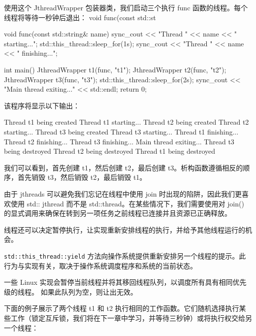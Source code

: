 使用这个 JthreadWrapper 包装器类，我们启动三个执行 func 函数的线程。每个线程将等待一秒钟后退出： void func(const std::st

\begin{cpp}
void func(const std::string& name) {
    sync_cout << "Thread " << name << " starting...\n";
    std::this_thread::sleep_for(1s);
    sync_cout << "Thread " << name << " finishing...\n";
}

int main() {
    JthreadWrapper t1(func, "t1");
    JthreadWrapper t2(func, "t2");
    JthreadWrapper t3(func, "t3");
    std::this_thread::sleep_for(2s);
    sync_cout << "Main thread exiting..." << std::endl;
    return 0;
}
\end{cpp}

该程序将显示以下输出：

\begin{shell}
Thread t1 being created
Thread t1 starting...
Thread t2 being created
Thread t2 starting...
Thread t3 being created
Thread t3 starting...
Thread t1 finishing...
Thread t2 finishing...
Thread t3 finishing...
Main thread exiting...
Thread t3 being destroyed
Thread t2 being destroyed
Thread t1 being destroyed
\end{shell}

我们可以看到，首先创建 t1，然后创建 t2，最后创建 t3。析构函数遵循相反的顺序，首先销毁 t3，然后销毁 t2，最后销毁 t1。

由于 jthreads 可以避免我们忘记在线程中使用 join 时出现的陷阱，因此我们更喜欢使用 std:: jthread 而不是 std::thread。在某些情况下，我们需要使用对 join() 的显式调用来确保在转到另一项任务之前线程已连接并且资源已正确释放。


线程还可以决定暂停执行，让实现重新安排线程的执行，并给予其他线程运行的机会。

\verb|std::this_thread::yield| 方法向操作系统提供重新安排另一个线程的提示。此行为与实现有关，取决于操作系统调度程序和系统的当前状态。

一些 Linux 实现会暂停当前线程并将其移回线程队列，以调度所有具有相同优先级的线程。
如果此队列为空，则让出无效。

下面的例子展示了两个线程 t1 和 t2 执行相同的工作函数。它们随机选择执行某些工作（锁定互斥锁，我们将在下一章中学习，并等待三秒钟）或将执行权交给另一个线程：

